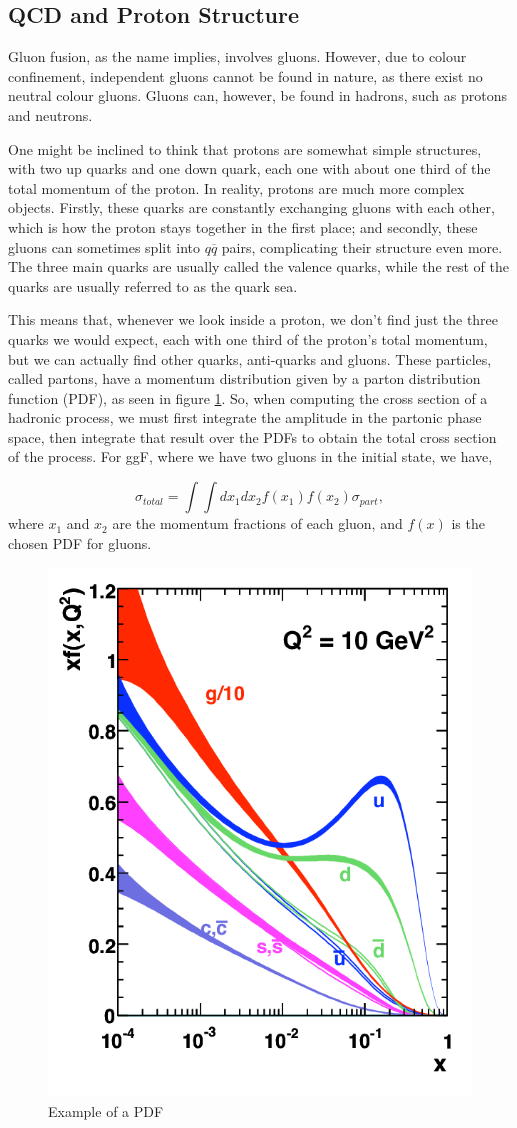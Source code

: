 \documentclass[EPJ,twocolumn]{webofc}
\begin{document}
\subsection*{QCD and Proton Structure}
Gluon fusion, as the name implies, involves gluons. However, due to colour confinement, independent gluons cannot be found in nature, as there exist no neutral colour gluons\cite{Thomson:2013zua}. Gluons can, however, be found in hadrons, such as protons and neutrons.

One might be inclined to think that protons are somewhat simple structures, with two up quarks and one down quark, each one with about one third of the total momentum of the proton. In reality, protons are much more complex objects. Firstly, these quarks are constantly exchanging gluons with each other, which is how the proton stays together in the first place; and secondly, these gluons can sometimes split into $q\overline{q}$ pairs, complicating their structure even more. The three main quarks are usually called the valence quarks, while the rest of the quarks are usually referred to as the quark sea.

This means that, whenever we look inside a proton, we don't find just the three quarks we would expect, each with one third of the proton's total momentum, but we can actually find other quarks, anti-quarks and gluons. These particles, called partons, have a momentum distribution given by a parton distribution function (PDF), as seen in figure \ref{PDF}. So, when computing the cross section of a hadronic process, we must first integrate the amplitude in the partonic phase space, then integrate that result over the PDFs to obtain the total cross section of the process. For ggF, where we have two gluons in the initial state, we have,

\begin{equation}
    \sigma_{total} = \int\int dx_1dx_2 f\left(x_1\right)f\left(x_2\right)\sigma_{part},
\end{equation}
where $x_1$ and $x_2$ are the momentum fractions of each gluon, and $f(x)$ is the chosen PDF for gluons.



\begin{figure}[t]
    \centering
    \includegraphics[width=.5\columnwidth]{Images/PDF.png}
  \center  \caption{Example of a PDF}
    \label{PDF}
\end{figure}
\end{document}
